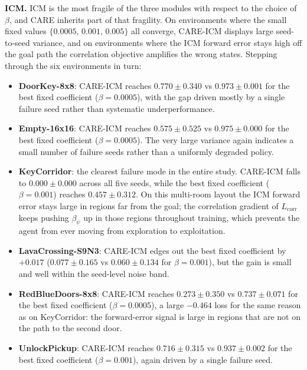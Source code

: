 

\textbf{ICM.} ICM is the most fragile of the three modules with respect to the choice of $\beta$, and CARE inherits part of that fragility. On environments where the small fixed values $\{0.0005,\,0.001,\,0.005\}$ all converge, CARE-ICM displays large seed-to-seed variance, and on environments where the ICM forward error stays high off the goal path the correlation objective amplifies the wrong states. Stepping through the six environments in turn:

\begin{itemize}
    \item \textbf{DoorKey-8x8}: CARE-ICM reaches $0.770 \pm 0.340$ vs $0.973 \pm 0.001$ for the best fixed coefficient ($\beta = 0.0005$), with the gap driven mostly by a single failure seed rather than systematic underperformance.
    \item \textbf{Empty-16x16}: CARE-ICM reaches $0.575 \pm 0.525$ vs $0.975 \pm 0.000$ for the best fixed coefficient ($\beta = 0.0005$). The very large variance again indicates a small number of failure seeds rather than a uniformly degraded policy.
    \item \textbf{KeyCorridor}: the clearest failure mode in the entire study. CARE-ICM falls to $0.000 \pm 0.000$ across all five seeds, while the best fixed coefficient ($\beta = 0.001$) reaches $0.457 \pm 0.312$. On this multi-room layout the ICM forward error stays large in regions far from the goal; the correlation gradient of $L_\text{corr}$ keeps pushing $\beta_\psi$ up in those regions throughout training, which prevents the agent from ever moving from exploration to exploitation.
    \item \textbf{LavaCrossing-S9N3}: CARE-ICM edges out the best fixed coefficient by $+0.017$ ($0.077 \pm 0.165$ vs $0.060 \pm 0.134$ for $\beta = 0.001$), but the gain is small and well within the seed-level noise band.
    \item \textbf{RedBlueDoors-8x8}: CARE-ICM reaches $0.273 \pm 0.350$ vs $0.737 \pm 0.071$ for the best fixed coefficient ($\beta = 0.0005$), a large $-0.464$ loss for the same reason as on KeyCorridor: the forward-error signal is large in regions that are not on the path to the second door.
    \item \textbf{UnlockPickup}: CARE-ICM reaches $0.716 \pm 0.315$ vs $0.937 \pm 0.002$ for the best fixed coefficient ($\beta = 0.001$), again driven by a single failure seed.
\end{itemize}

